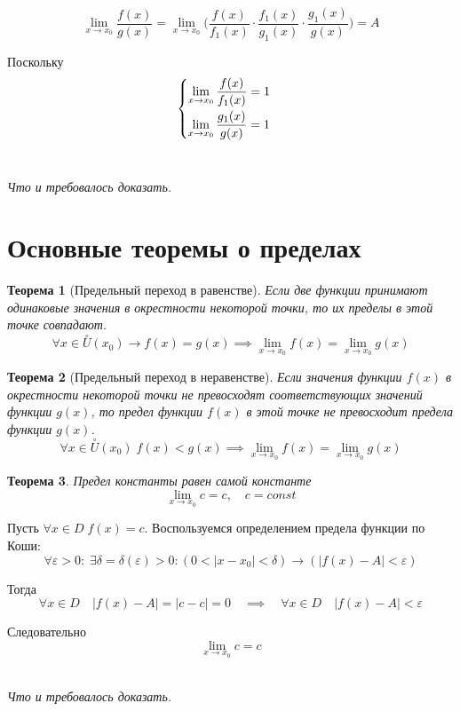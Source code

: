 \documentclass[a4paper,12pt,oneside]{extbook}
\newcommand{\newpar}{$ $\par\nobreak\ignorespaces}
\theoremstyle{numbered}
\theoremstyle{unnumbered}
\theoremstyle{named}
\newtheorem{theorem}{Теорема}[section]
\theoremstyle{unnumbered}
\theoremstyle{named}
\theoremstyle{named}
\theoremstyle{named}
\renewenvironment{proof}[1][]{\breakenv[Доказательство]{\if\relax\detokenize{#1}\relax\else\;\fi}{\textbf{#1}}}{\smallskip\newpar \hfill\textit{Что и требовалось доказать.}}
\begin{document}
\begin{proof}
    \[
        \lim_{x \to x_0}{\dfrac{f(x)}{g(x)}} = \lim_{x \to x_0}{\Big(\dfrac{f(x)}{f_1(x)} \cdot \dfrac{f_1(x)}{g_1(x)} \cdot \dfrac{g_1(x)}{g(x)}\Big)} = A
    \]

    Поскольку
    \[
        \begin{cases}
            \smallskip
            \displaystyle \lim_{x \to x_0}{\frac{f(x)}{f_1(x)}} = 1 \\
            \displaystyle \lim_{x \to x_0}{\frac{g_1(x)}{g(x)}} = 1
        \end{cases}
    \]
\end{proof}

\section{Основные теоремы о пределах}%
\label{sec:Основные теоремы о пределах}

\begin{theorem}[Предельный переход в равенстве]
    Если две функции принимают одинаковые значения в окрестности некоторой точки, то их пределы в этой точке совпадают.
    \[
        \forall x \in \overset{\circ}{U}(x_0) \rightarrow f(x) = g(x) \implies \lim_{x \to x_0}{f(x)} = \lim_{x \to x_0}{g(x)}
    \]
\end{theorem}

\begin{theorem}[Предельный переход в неравенстве]
    Если значения функции \(f(x)\) в окрестности некоторой точки не превосходят соответствующих значений функции \(g(x)\), то предел функции \(f(x)\) в этой точке не превосходит предела функции \(g(x)\).
    \[
        \forall x \in \overset{\circ}{U}(x_0) \; f(x) < g(x) \implies \lim_{x \to x_0}{f(x)} = \lim_{x \to x_0}{g(x)}
    \]
\end{theorem}

\begin{theorem}
    Предел константы равен самой константе
    \[
        \lim_{x \to x_0}{c} = c, \quad c = const
    \]
\end{theorem}

\begin{proof}
    Пусть \(\forall x \in D \; f(x) = c\).
    Воспользуемся определением предела функции по Коши:
    \[
        \forall \varepsilon > 0: \; \exists \delta = \delta(\varepsilon) > 0: (0 < |x - x_0| < \delta) \rightarrow (|f(x) - A| < \varepsilon)
    \]

    Тогда
    \[
        \forall x \in D \quad |f(x) - A| = |c - c| = 0 \quad \implies \quad \forall x \in D \quad |f(x) - A | < \varepsilon
    \]

    Следовательно
    \[
        \lim_{x \to x_0}{c} = c
    \]
\end{proof}
\end{document}
